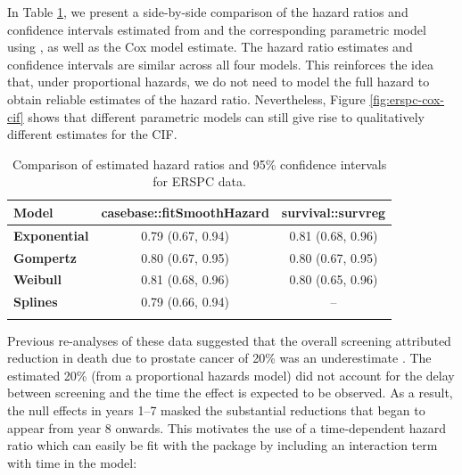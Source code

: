 \documentclass[
]{jss}
\begin{document}
In Table \ref{tab:print-erspc-estimates}, we present a side-by-side
comparison of the hazard ratios and confidence intervals estimated from
 and the corresponding parametric model using
, as well as the Cox model estimate. The hazard
ratio estimates and confidence intervals are similar across all four
models. This reinforces the idea that, under proportional hazards, we do
not need to model the full hazard to obtain reliable estimates of the
hazard ratio. Nevertheless, Figure \ref{fig:erspc-cox-cif} shows that
different parametric models can still give rise to qualitatively
different estimates for the CIF.

\begin{CodeChunk}
\begin{table}

\caption{\label{tab:print-erspc-estimates}Comparison of estimated hazard ratios and 95\% confidence intervals for ERSPC data.}
\centering
\begin{tabular}[t]{>{\bfseries}lcc}
\toprule
Model & casebase::fitSmoothHazard & survival::survreg\\
\midrule
Exponential & 0.79 (0.67, 0.94) & 0.81 (0.68, 0.96)\\
\cmidrule{1-3}
Gompertz & 0.80 (0.67, 0.95) & 0.80 (0.67, 0.95)\\
\cmidrule{1-3}
Weibull & 0.81 (0.68, 0.96) & 0.80 (0.65, 0.96)\\
\cmidrule{1-3}
Splines & 0.79 (0.66, 0.94) & --\\
\bottomrule
\multicolumn{3}{l}{Cox model estimate: HR (95\% CI) = 0.80 (0.67, 0.95)}\\
\end{tabular}
\end{table}

\end{CodeChunk}

Previous re-analyses of these data suggested that the overall screening
attributed reduction in death due to prostate cancer of 20\% was an
underestimate \citep{hanley2010mortality}. The estimated 20\% (from a
proportional hazards model) did not account for the delay between
screening and the time the effect is expected to be observed. As a
result, the null effects in years 1--7 masked the substantial reductions
that began to appear from year 8 onwards. This motivates the use of a
time-dependent hazard ratio which can easily be fit with the
 package by including an interaction term with time in the
model:
\end{document}
